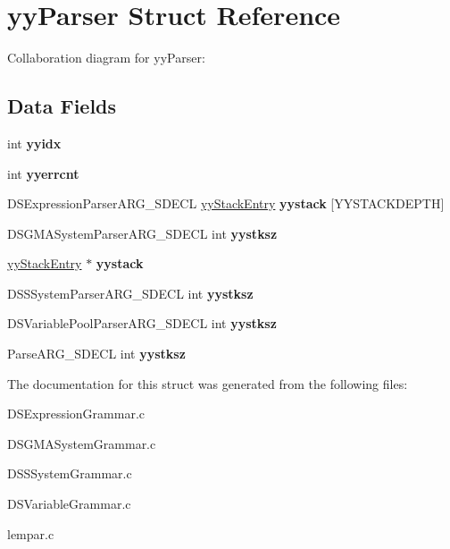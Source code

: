 \hypertarget{structyy_parser}{
\section{yyParser Struct Reference}
\label{structyy_parser}
}


Collaboration diagram for yyParser:\subsection*{Data Fields}
\begin{DoxyCompactItemize}
\item 
\hypertarget{structyy_parser_aa2a03c2f11e7c7623c34ea15f4dcf792}{
int {\bfseries yyidx}}
\label{structyy_parser_aa2a03c2f11e7c7623c34ea15f4dcf792}

\item 
\hypertarget{structyy_parser_a1ca8dbcc28d2254fbab94c873aba1598}{
int {\bfseries yyerrcnt}}
\label{structyy_parser_a1ca8dbcc28d2254fbab94c873aba1598}

\item 
\hypertarget{structyy_parser_a22afb969bba187ee3b04b206815fb5db}{
DSExpressionParserARG\_\-SDECL \hyperlink{structyy_stack_entry}{yyStackEntry} {\bfseries yystack} \mbox{[}YYSTACKDEPTH\mbox{]}}
\label{structyy_parser_a22afb969bba187ee3b04b206815fb5db}

\item 
\hypertarget{structyy_parser_a5718e76c3d3d01474ab3da5c254e1320}{
DSGMASystemParserARG\_\-SDECL int {\bfseries yystksz}}
\label{structyy_parser_a5718e76c3d3d01474ab3da5c254e1320}

\item 
\hypertarget{structyy_parser_a6b048f6bee3fff5585d8f9b56d9fbbff}{
\hyperlink{structyy_stack_entry}{yyStackEntry} $\ast$ {\bfseries yystack}}
\label{structyy_parser_a6b048f6bee3fff5585d8f9b56d9fbbff}

\item 
\hypertarget{structyy_parser_a4896e7114aee24451dc84afd46337ab8}{
DSSSystemParserARG\_\-SDECL int {\bfseries yystksz}}
\label{structyy_parser_a4896e7114aee24451dc84afd46337ab8}

\item 
\hypertarget{structyy_parser_a4c2b2f9c4d7353c97078d7c35fe9ad9f}{
DSVariablePoolParserARG\_\-SDECL int {\bfseries yystksz}}
\label{structyy_parser_a4c2b2f9c4d7353c97078d7c35fe9ad9f}

\item 
\hypertarget{structyy_parser_a2bea0a0289cda9d3d163c09b1707f2aa}{
ParseARG\_\-SDECL int {\bfseries yystksz}}
\label{structyy_parser_a2bea0a0289cda9d3d163c09b1707f2aa}

\end{DoxyCompactItemize}


The documentation for this struct was generated from the following files:\begin{DoxyCompactItemize}
\item 
DSExpressionGrammar.c\item 
DSGMASystemGrammar.c\item 
DSSSystemGrammar.c\item 
DSVariableGrammar.c\item 
lempar.c\end{DoxyCompactItemize}
